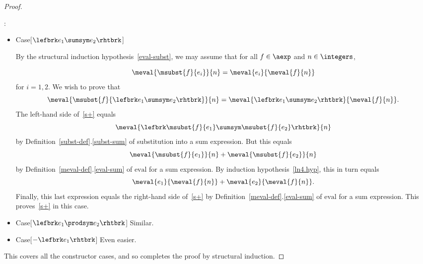 \begin{definition}
\begin{proof}
\begin{itemize}
\end{itemize}

:
\begin{itemize}

\item Case[$\lefbrk e_1 \sumsym e_2 \rhtbrk$]

  By the structural induction hypothesis~\eqref{eval-subst}, we may assume
  that for all $f \in \aexp$ and $n \in \integers$,

\begin{equation}\label{ln4.hyp}
\meval{\msubst{f}{e_i}}{n}  =  \meval{e_i}{\meval{f}{n}}
\end{equation}
for $i= 1,2$.  We wish to prove that
\begin{equation}\label{s+}
\meval{\msubst{f}{\lefbrk e_1\sumsym e_2 \rhtbrk}}{n} = \meval{\lefbrk
  e_1 \sumsym e_2 \rhtbrk}{ \meval{f}{n}}.
\end{equation}
The left-hand side of~\eqref{s+} equals
\[
\meval{\lefbrk \msubst{f}{e_1} \sumsym \msubst{f}{e_2} \rhtbrk}{ n}
\]
by Definition~\ref{subst-def}.\ref{subst-sum} of substitution into a sum
expression.  But this equals
\[
\meval{\msubst{f}{e_1}}{n} + \meval{\msubst{f}{e_2}}{n}
\]
by Definition~\ref{meval-def}.\eqref{eval-sum} of $\text{eval}$ for a sum expression.  By
induction hypothesis~\eqref{ln4.hyp}, this in turn equals
\[
\meval{e_1}{\meval{f}{n}} + \meval{e_2}{\meval{f}{n}}.
\]
Finally, this last expression equals the right-hand side of~\eqref{s+} by
Definition~\ref{meval-def}.\eqref{eval-sum} of $\text{eval}$ for a sum
expression.  This proves~\eqref{s+} in this case.

\item Case[$\lefbrk e_1 \prodsym e_2 \rhtbrk$]  Similar.

\item Case[$-\lefbrk e_1 \rhtbrk$]  Even easier.

\end{itemize}

This covers all the constructor cases, and so completes the proof by
structural induction.

\end{proof}

\begin{problems}
\practiceproblems
{}

\classproblems
{}

\homeworkproblems
{}
\end{problems}


\end{definition}

